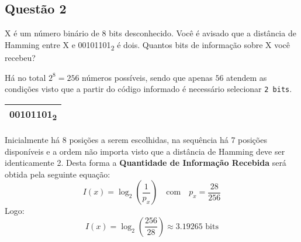 \documentclass{article}
\begin{document}
        \newpage\subsection{Questão 2}
            \begin{exercise}
                X é um número binário de 8 bits desconhecido. Você é avisado que a distância de Hamming entre X e 00101101\textsubscript{2} é dois. Quantos bits de informação sobre X você recebeu?
            \end{exercise}
            \begin{resolution}
                Há no total $2^{8} = 256$ números possíveis, sendo que apenas $56$ atendem as condições visto que a partir do código informado é necessário selecionar \texttt{2 bits}.
                    \begin{table}[H]
                        \centering
                        \begin{tabular}[]{c}\hline
                            00101101\textsubscript{2}\\\hline
                        \end{tabular}
                    \end{table}\noindent
                Inicialmente há 8 posições a serem escolhidas, na sequência há 7 posições disponíveis e a ordem não importa visto que a distância de Hamming deve ser identicamente 2. Desta forma a \textbf{Quantidade de Informação Recebida} será obtida pela seguinte equação:
                    \begin{equation*}
                        I(x) = \log_{2}\left(\frac{1}{p_{x}}\right)
                        \quad\text{com}\quad
                        p_{x} = \frac{28}{256}
                    \end{equation*}
                Logo:
                    \begin{equation*}
                        I(x) = \log_{2}\left(\frac{256}{28}\right) \approx \boxed{3.19265 \text{ bits}}
                    \end{equation*}
            \end{resolution}
\end{document}
